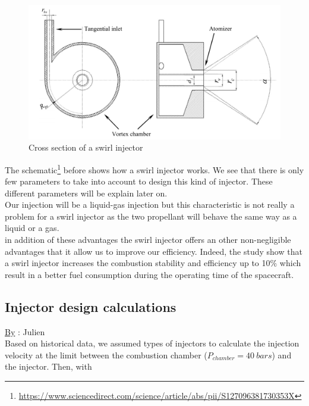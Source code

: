 \begin{figure}[H]
    \centering
    \includegraphics[width=\linewidth]{swirl}
    \caption{Cross section of a swirl injector}
\end{figure}

The schematic\footnote{\url{https://www.sciencedirect.com/science/article/abs/pii/S127096381730353X}} before shows how a swirl injector works. We see that there is only few parameters to take into account to design this kind of injector. These different parameters will be explain later on. \\

Our injection will be a liquid-gas injection but this characteristic is not really a problem for a swirl injector as the two propellant will behave the same way as a liquid or a gas.\\

in addition of these advantages the swirl injector offers an other non-negligible advantages that it allow us to improve our efficiency. Indeed, the study show that a swirl injector increases the combustion stability and efficiency up to 10$\%$ which result in a better fuel consumption during the operating time of the spacecraft. 
\pagebreak
\subsection{Injector design calculations}
\qquad \underline{By} : Julien\\

Based on historical data, we assumed types of injectors to calculate the injection velocity at the limit between the combustion chamber ($P_{chamber} = 40\ bars$) and the injector. Then, with 

